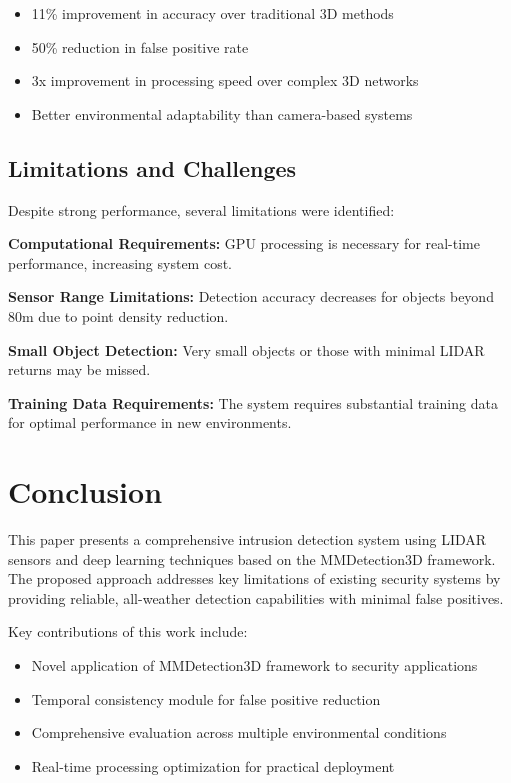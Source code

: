 \documentclass[conference]{IEEEtran}
\begin{document}
\begin{itemize}
\item 11\% improvement in accuracy over traditional 3D methods
\item 50\% reduction in false positive rate
\item 3x improvement in processing speed over complex 3D networks
\item Better environmental adaptability than camera-based systems
\end{itemize}

\subsection{Limitations and Challenges}
Despite strong performance, several limitations were identified:

\textbf{Computational Requirements:} GPU processing is necessary for real-time performance, increasing system cost.

\textbf{Sensor Range Limitations:} Detection accuracy decreases for objects beyond 80m due to point density reduction.

\textbf{Small Object Detection:} Very small objects or those with minimal LIDAR returns may be missed.

\textbf{Training Data Requirements:} The system requires substantial training data for optimal performance in new environments.

\section{Conclusion}
This paper presents a comprehensive intrusion detection system using LIDAR sensors and deep learning techniques based on the MMDetection3D framework. The proposed approach addresses key limitations of existing security systems by providing reliable, all-weather detection capabilities with minimal false positives.

Key contributions of this work include:

\begin{itemize}
\item Novel application of MMDetection3D framework to security applications
\item Temporal consistency module for false positive reduction
\item Comprehensive evaluation across multiple environmental conditions
\item Real-time processing optimization for practical deployment
\end{itemize}
\end{document}
